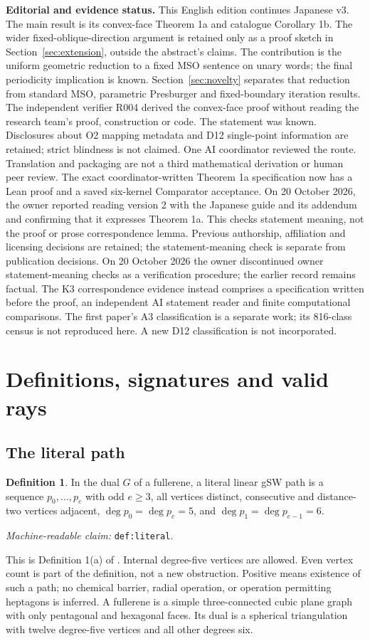 \documentclass[11pt]{amsart}
\newcommand{\record}[1]{\nolinkurl{#1}}
\newcommand{\claimid}[1]{\par\nopagebreak\noindent\textit{Machine-readable claim:} \record{#1}.\par}
\theoremstyle{definition}\newtheorem{definition}{Definition}
\begin{document}
\noindent\textbf{Editorial and evidence status.}
This English edition continues Japanese v3. The
main result is its convex-face Theorem 1a and catalogue Corollary 1b.
The wider fixed-oblique-direction argument is retained only as a proof
sketch in Section~\ref{sec:extension}, outside the abstract's claims.
The contribution is the uniform geometric reduction to a fixed MSO
sentence on unary words; the final periodicity implication is known.
Section~\ref{sec:novelty} separates that reduction from standard
MSO, parametric Presburger and fixed-boundary iteration results.
The independent verifier R004 derived the convex-face proof without
reading the research team's proof, construction or code. The statement
was known. Disclosures about O2 mapping metadata and D12 single-point
information are retained; strict blindness is not claimed. One AI
coordinator reviewed the route. Translation and packaging are not a
third mathematical derivation or human peer review. The exact
coordinator-written Theorem 1a specification now has a Lean proof
and a saved six-kernel Comparator acceptance. On 20 October 2026,
the owner reported reading version 2 with the Japanese guide and its
addendum and confirming that it expresses Theorem 1a. This checks
statement meaning, not the proof or prose correspondence lemma. Previous
authorship, affiliation and licensing decisions are retained; the
statement-meaning check is separate from publication decisions. On
20 October 2026 the owner discontinued owner statement-meaning checks as a
verification procedure; the earlier record remains factual. The K3
correspondence evidence instead comprises a specification written before
the proof, an independent AI statement reader and finite computational
comparisons. The first paper's
A3 classification is a separate work; its 816-class census is not
reproduced here. A new D12 classification is not incorporated.

\clearpage
\section{Definitions, signatures and valid rays}\label{sec:definitions}
\subsection{The literal path}
\begin{definition}\label{def:literal}
In the dual $G$ of a fullerene, a literal linear gSW path is a sequence
$p_0,\ldots,p_e$ with odd $e\ge3$, all vertices distinct, consecutive
and distance-two vertices adjacent, $\deg p_0=\deg p_e=5$, and
$\deg p_1=\deg p_{e-1}=6$.
\end{definition}
\claimid{def:literal}
This is Definition 1(a) of \cite{BBS}. Internal degree-five vertices
are allowed. Even vertex count is part of the definition, not a new
obstruction. Positive means existence of such a path; no chemical
barrier, radial operation, or operation permitting heptagons is inferred.
A fullerene is a simple three-connected cubic plane graph with only
pentagonal and hexagonal faces. Its dual is a spherical triangulation
with twelve degree-five vertices and all other degrees six.
\end{document}

